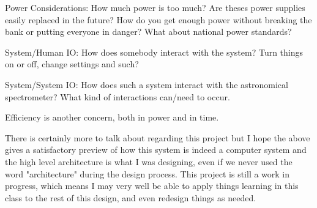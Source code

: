 \documentclass[prb,preprint]{revtex4-1}
\begin{document}
Power Considerations: How much power is too much? Are theses power supplies easily replaced in the future? How do you get enough power without breaking the bank or putting everyone in danger? What about national power standards?

System/Human IO: How does somebody interact with the system? Turn things on or off, change settings and such?

System/System IO: How does such a system interact with the astronomical spectrometer? What kind of interactions can/need to occur.

Efficiency is another concern, both in power and in time.
\newline


There is certainly more to talk about regarding this project but I hope the above gives a satisfactory preview of how this system is indeed a computer system and the high level architecture is what I was designing, even if we never used the word "architecture" during the design process. This project is still a work in progress, which means I may very well be able to apply things learning in this class to the rest of this design, and even redesign things as needed.


\end{document}
